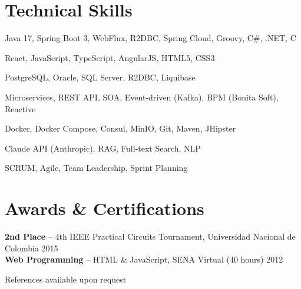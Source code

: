\documentclass[11pt,a4paper]{article}
\begin{document}
\section{Technical Skills}

\begin{description}[leftmargin=7.5em, labelwidth=7em, labelsep=0.5em, nosep, font=\bfseries\color{darktext}]
    \item[Backend] Java 17, Spring Boot 3, WebFlux, R2DBC, Spring Cloud, Groovy, C\#, .NET, C
    \item[Frontend] React, JavaScript, TypeScript, AngularJS, HTML5, CSS3
    \item[Databases] PostgreSQL, Oracle, SQL Server, R2DBC, Liquibase
    \item[Architecture] Microservices, REST API, SOA, Event-driven (Kafka), BPM (Bonita Soft), Reactive
    \item[DevOps] Docker, Docker Compose, Consul, MinIO, Git, Maven, JHipster
    \item[AI/ML] Claude API (Anthropic), RAG, Full-text Search, NLP
    \item[Methodology] SCRUM, Agile, Team Leadership, Sprint Planning
\end{description}

\section{Awards \& Certifications}

\textbf{2nd Place} -- 4th IEEE Practical Circuits Tournament, Universidad Nacional de Colombia \hfill {\color{lighttext} 2015} \\
\textbf{Web Programming} -- HTML \& JavaScript, SENA Virtual (40 hours) \hfill {\color{lighttext} 2012}

\vspace{6pt}

\begin{center}
    {\small\color{lighttext} References available upon request}
\end{center}
\end{document}
